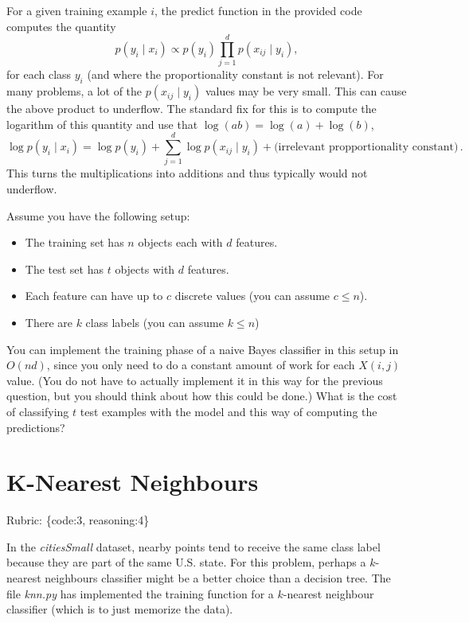 \documentclass{article}
\def\rubric#1{\gre{Rubric: \{#1\}}}{}
\def\blu#1{{\color{blu}#1}}
\def\gre#1{{\color{gre}#1}}
\def\cond{\; | \;}
\def\items#1{\begin{itemize}#1\end{itemize}}
\begin{document}
For a given training example $i$, the predict function in the provided code computes the quantity
\[
p(y_i \cond x_i) \propto p(y_i)\prod_{j=1}^d p(x_{ij} \cond y_i),
\]
for each class $y_i$ (and where the proportionality constant is not relevant). For many problems, a lot of the $p(x_{ij} \cond y_i)$ values may be very small. This can cause the above product to underflow. The standard fix for this is to compute the logarithm of this quantity and use that $\log(ab) = \log(a)+\log(b)$,
\[
\log p(y_i \cond x_i) = \log p(y_i) + \sum_{j=1}^d \log p(x_{ij} \cond y_i) + \text{(irrelevant propportionality constant)} \, .
\]
This turns the multiplications into additions and thus typically would not underflow.

Assume you have the following setup:
\items{
\item The training set has $n$ objects each with $d$ features.
\item The test set has $t$ objects with $d$ features.
\item Each feature can have up to $c$ discrete values (you can assume $c \leq n$).
\item There are $k$ class labels (you can assume $k \leq n$)
}
You can implement the training phase of a naive Bayes classifier in this setup in $O(nd)$, since you only need to do a constant amount of work for each $X(i,j)$ value. (You do not have to actually implement it in this way for the previous question, but you should think about how this could be done.)
 \blu{What is the cost of classifying $t$ test examples with the model and this way of computing the predictions?}


\section{K-Nearest Neighbours}
\rubric{code:3, reasoning:4}

In the \emph{citiesSmall} dataset, nearby points tend to receive the same class label because they are part of the same U.S. state. For this problem, perhaps a $k$-nearest neighbours classifier might be a better choice than a decision tree. The file \emph{knn.py} has implemented the training function for a $k$-nearest neighbour classifier (which is to just memorize the data).
\end{document}
